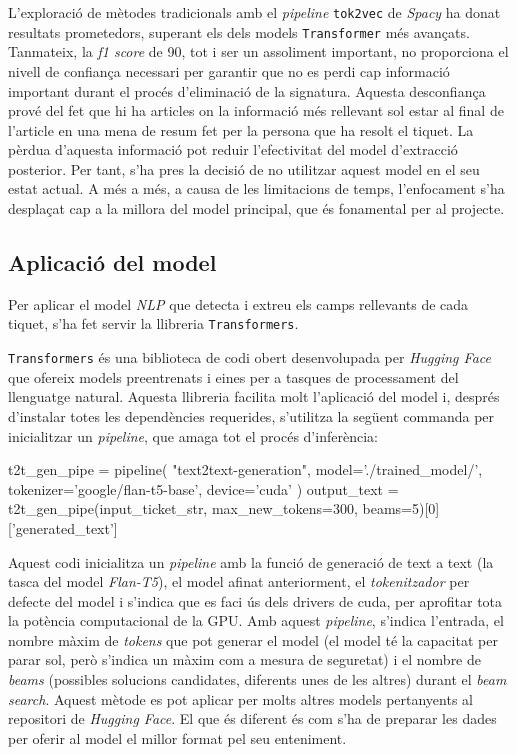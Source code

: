 L'exploració de mètodes tradicionals amb el \textit{pipeline} \texttt{tok2vec} de \textit{Spacy} ha donat resultats prometedors, superant els dels models \texttt{Transformer} més avançats. Tanmateix, la \textit{f1 score} de 90, tot i ser un assoliment important, no proporciona el nivell de confiança necessari per garantir que no es perdi cap informació important durant el procés d'eliminació de la signatura. Aquesta desconfiança prové del fet que hi ha articles on la informació més rellevant sol estar al final de l'article en una mena de resum fet per la persona que ha resolt el tiquet. La pèrdua d'aquesta informació pot reduir l'efectivitat del model d'extracció posterior. Per tant, s'ha pres la decisió de no utilitzar aquest model en el seu estat actual. A més a més, a causa de les limitacions de temps, l'enfocament s'ha desplaçat cap a la millora del model principal, que és fonamental per al projecte.

\subsection{Aplicació del model}
Per aplicar el model \textit{NLP} que detecta i extreu els camps rellevants de cada tiquet, s'ha fet servir la llibreria \texttt{Transformers}.

\texttt{Transformers} és una biblioteca de codi obert desenvolupada per \textit{Hugging Face} \cite{Hugging-Face} que ofereix models preentrenats i eines per a tasques de processament del llenguatge natural. Aquesta llibreria facilita molt l'aplicació del model i, després d'instalar totes les dependències requerides, s'utilitza la següent commanda per inicialitzar un \textit{pipeline}, que amaga tot el procés d'inferència:

\begin{python}
t2t_gen_pipe = pipeline(
     "text2text-generation",
     model='./trained_model/',
     tokenizer='google/flan-t5-base',
     device='cuda'
     )     
output_text = t2t_gen_pipe(input_ticket_str, max_new_tokens=300, beams=5)[0]['generated_text']
\end{python}

Aquest codi inicialitza un \textit{pipeline} amb la funció de generació de text a text (la tasca del model \textit{Flan-T5}), el model afinat anteriorment, el \textit{tokenitzador} per defecte del model i s'indica que es faci ús dels drivers de cuda, per aprofitar tota la potència computacional de la GPU. Amb aquest \textit{pipeline}, s'indica l'entrada, el nombre màxim de \textit{tokens} que pot generar el model (el model té la capacitat per parar sol, però s'indica un màxim com a mesura de seguretat) i el nombre de \textit{beams} (possibles solucions candidates, diferents unes de les altres) durant el \textit{beam search}. Aquest mètode es pot aplicar per molts altres models pertanyents al repositori de \textit{Hugging Face}. El que és diferent és com s'ha de preparar les dades per oferir al model el millor format pel seu enteniment.


